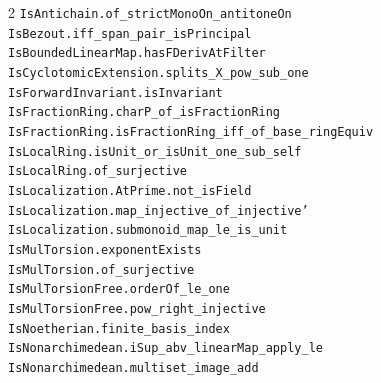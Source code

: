 \documentclass[10pt,a4paper]{article}
\begin{document}
\begin{multicols}{2}
\texttt{IsAntichain.\allowbreak{}of\_strictMonoOn\_antitoneOn} \\
\texttt{IsBezout.\allowbreak{}iff\_span\_pair\_isPrincipal} \\
\texttt{IsBoundedLinearMap.\allowbreak{}hasFDerivAtFilter} \\
\texttt{IsCyclotomicExtension.\allowbreak{}splits\_X\_pow\_sub\_one} \\
\texttt{IsForwardInvariant.\allowbreak{}isInvariant} \\
\texttt{IsFractionRing.\allowbreak{}charP\_of\_isFractionRing} \\
\texttt{IsFractionRing.\allowbreak{}isFractionRing\_iff\_of\_base\_ringEquiv} \\
\texttt{IsLocalRing.\allowbreak{}isUnit\_or\_isUnit\_one\_sub\_self} \\
\texttt{IsLocalRing.\allowbreak{}of\_surjective} \\
\texttt{IsLocalization.\allowbreak{}AtPrime.\allowbreak{}not\_isField} \\
\texttt{IsLocalization.\allowbreak{}map\_injective\_of\_injective'} \\
\texttt{IsLocalization.\allowbreak{}submonoid\_map\_le\_is\_unit} \\
\texttt{IsMulTorsion.\allowbreak{}exponentExists} \\
\texttt{IsMulTorsion.\allowbreak{}of\_surjective} \\
\texttt{IsMulTorsionFree.\allowbreak{}orderOf\_le\_one} \\
\texttt{IsMulTorsionFree.\allowbreak{}pow\_right\_injective} \\
\texttt{IsNoetherian.\allowbreak{}finite\_basis\_index} \\
\texttt{IsNonarchimedean.\allowbreak{}iSup\_abv\_linearMap\_apply\_le} \\
\texttt{IsNonarchimedean.\allowbreak{}multiset\_image\_add} \\

\end{multicols}
\end{document}

